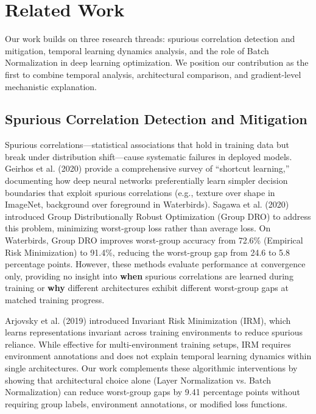 \section{Related Work}

Our work builds on three research threads: spurious correlation detection and mitigation, temporal learning dynamics analysis, and the role of Batch Normalization in deep learning optimization. We position our contribution as the first to combine temporal analysis, architectural comparison, and gradient-level mechanistic explanation.

\subsection{Spurious Correlation Detection and Mitigation}

Spurious correlations---statistical associations that hold in training data but break under distribution shift---cause systematic failures in deployed models. Geirhos et al. (2020) \cite{geirhos2020shortcut} provide a comprehensive survey of ``shortcut learning,'' documenting how deep neural networks preferentially learn simpler decision boundaries that exploit spurious correlations (e.g., texture over shape in ImageNet, background over foreground in Waterbirds). Sagawa et al. (2020) \cite{sagawa2020distributionally} introduced Group Distributionally Robust Optimization (Group DRO) to address this problem, minimizing worst-group loss rather than average loss. On Waterbirds, Group DRO improves worst-group accuracy from 72.6\% (Empirical Risk Minimization) to 91.4\%, reducing the worst-group gap from 24.6 to 5.8 percentage points. However, these methods evaluate performance at convergence only, providing no insight into \textbf{when} spurious correlations are learned during training or \textbf{why} different architectures exhibit different worst-group gaps at matched training progress.

Arjovsky et al. (2019) \cite{arjovsky2019invariant} introduced Invariant Risk Minimization (IRM), which learns representations invariant across training environments to reduce spurious reliance. While effective for multi-environment training setups, IRM requires environment annotations and does not explain temporal learning dynamics within single architectures. Our work complements these algorithmic interventions by showing that architectural choice alone (Layer Normalization vs. Batch Normalization) can reduce worst-group gaps by 9.41 percentage points without requiring group labels, environment annotations, or modified loss functions.

